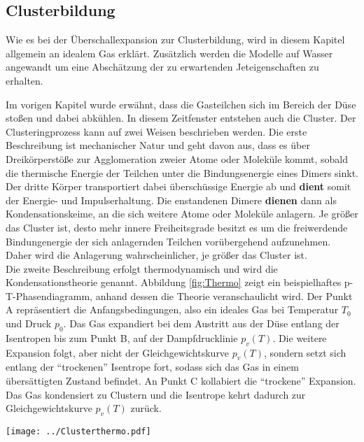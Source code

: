 
\subsection{Clusterbildung} \label{sec:Clusterbildung}


Wie es bei der Überschallexpansion zur Clusterbildung, wird in diesem Kapitel allgemein an idealem Gas erklärt. Zusätzlich werden die Modelle auf Wasser angewandt um eine Abschätzung der zu erwartenden Jeteigenschaften zu erhalten.

Im vorigen Kapitel wurde erwähnt, dass die Gasteilchen sich im Bereich der Düse stoßen und dabei abkühlen. In diesem Zeitfenster entstehen auch die Cluster. Der Clusteringprozess kann auf zwei Weisen beschrieben werden. Die erste Beschreibung ist mechanischer Natur und geht davon aus, dass es über Dreikörperstöße zur Agglomeration zweier Atome oder Moleküle kommt, sobald die thermische Energie der Teilchen unter die Bindungsenergie eines Dimers sinkt. Der dritte Körper transportiert dabei überschüssige Energie ab und \textbf{dient} somit der Energie- und Impulserhaltung. Die enstandenen Dimere \textbf{dienen} dann als Kondensationskeime, an die sich weitere Atome oder Moleküle anlagern. Je größer das Cluster ist, desto mehr innere Freiheitsgrade besitzt es um die freiwerdende Bindungenergie der sich anlagernden Teilchen vorübergehend aufzunehmen. Daher wird die Anlagerung wahrscheinlicher, je größer das Cluster ist. \cite{dreikcluster05} \\
Die zweite Beschreibung erfolgt thermodynamisch und wird die Kondensationstheorie genannt. 
Abbildung \ref{fig:Thermo} zeigt ein beispielhaftes p-T-Phasendiagramm, anhand dessen die Theorie veranschaulicht wird. Der Punkt A repräsentiert die Anfangsbedingungen, also ein ideales Gas bei Temperatur $T_0$ und Druck $p_0$. Das Gas expandiert bei dem Austritt aus der Düse entlang der Isentropen bis zum Punkt B, auf der Dampfdrucklinie $p_v(T)$. Die weitere Expansion folgt, aber nicht der Gleichgewichtskurve $p_v(T)$, sondern setzt sich entlang der \enquote{trockenen} Isentrope fort, sodass sich das Gas in einem übersättigten Zustand befindet. An Punkt C kollabiert die \enquote{trockene} Expansion. Das Gas kondensiert zu Clustern und die Isentrope kehrt dadurch zur Gleichgewichtskurve $p_v(T)$ zurück. \cite{hagena1981nucleation}

\begin{center}
\begin{minipage}{\linewidth}
\centering
\texttt{[image: ../Clusterthermo.pdf]}%
 \label{fig:Thermo}
\end{minipage} 
\end{center}

